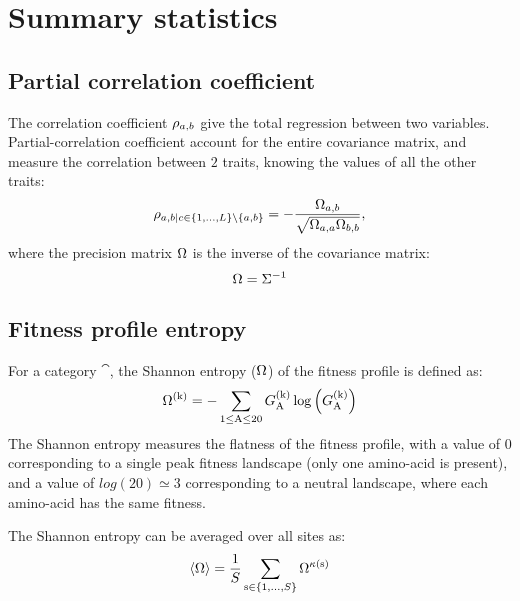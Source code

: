 \section{Summary statistics}
\label{sec:summary-statistics}

\subsection{Partial correlation coefficient}
\label{subsec:partial-correlation-coefficient}

The correlation coefficient $\rho_{a, b}$ give the total regression between two variables.
Partial-correlation coefficient account for the entire covariance matrix, and measure the correlation between $2$ traits, knowing the values of all the other traits:
\begin{equation}
    \rho_{a, b | c \in \{1, \hdots, L\} \setminus \{ a, b\} } = - \dfrac{\Omega_{a, b}}{\sqrt{\Omega_{a, a} \Omega_{b, b}}},
\end{equation}
where the precision matrix $\Omega$ is the inverse of the covariance matrix:
\begin{equation}
    \Omega = \Sigma^{-1}
\end{equation}

\subsection{Fitness profile entropy}
\label{subsec:fitness-profile-entropy}

For a category $\cat$, the Shannon entropy (${\Omega}$) of the fitness profile is defined as:
\begin{equation}
    {\Omega}^{(\text{k})} = - \sum\limits_{1 \leq \text{A} \leq 20} G^{(\text{k})}_{\text{A}} \log \left( G^{(\text{k})}_{\text{A}} \right)
\end{equation}
The Shannon entropy measures the flatness of the fitness profile, with a value of $0$ corresponding to a single peak fitness landscape (only one amino-acid is present), and a value of $log(20)\simeq3$ corresponding to a neutral landscape, where each amino-acid has the same fitness.

The Shannon entropy can be averaged over all sites as:
\begin{equation}
    \langle {\Omega} \rangle = \dfrac{1}{S}\sum\limits_{\text{s} \in \{1, \hdots, S\}} {\Omega}^{\kappa\left(\text{s}\right)}
\end{equation}


